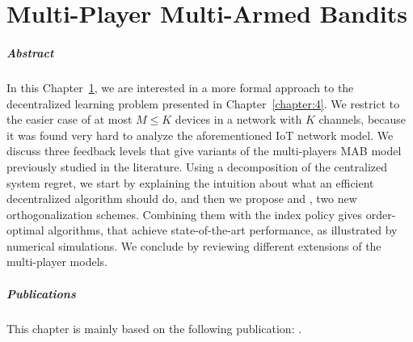 
\chapter{Multi-Player Multi-Armed Bandits}
\label{chapter:5}


\paragraph{Abstract}
%
In this Chapter~\ref{chapter:5}, we are interested in a more formal approach to the decentralized learning problem presented in Chapter~\ref{chapter:4}.
We restrict to the easier case of at most $M \leq K$ devices in a network with $K$ channels, because it was found very hard to analyze the aforementioned IoT network model.
%
We discuss three feedback levels that give variants of the multi-players MAB model previously studied in the literature.
Using a decomposition of the centralized system regret, we start by explaining the intuition about what an efficient decentralized algorithm should do, and then we propose \RandTopM{} and \MCTopM, two new orthogonalization schemes.
Combining them with the \klUCB{} index policy gives order-optimal algorithms, that achieve state-of-the-art performance,
as illustrated by numerical simulations.
We conclude by reviewing different extensions of the multi-player models.

\minitoc

\vfill{}

\paragraph{Publications}

This chapter is mainly based on the following publication: \cite{Besson2018ALT}.


\newpage
\graphicspath{{2-Chapters/5-Chapter/Images/}}
\graphicspath{{2-Chapters/5-Chapter/ALT_2018__MPBandits.git/figures/}}




\newpage  %
